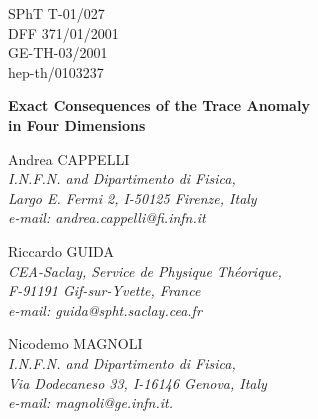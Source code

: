 \documentclass[11pt]{article}
\begin{document}
  
 
 
\begin{titlepage} 
\begin{center} 
 
\hfill SPhT T-01/027 \\
\hfill  DFF 371/01/2001 \\ 
\hfill  GE-TH-03/2001\\ 
\hfill hep-th/0103237\\
 
\vspace{1.cm} 
 
{\bf\Large Exact Consequences of the Trace Anomaly} \\ 
 
\bigskip 
{\bf\Large in Four Dimensions}\\ 
 
\vspace{1cm} 
 
Andrea CAPPELLI\\ 
\normalsize\textit{ I.N.F.N. and Dipartimento di Fisica,} \\ 
\normalsize\textit{ Largo E. Fermi 2, I-50125 Firenze, Italy}\\ 
\normalsize\textit{ e-mail: andrea.cappelli@fi.infn.it}\\ 
 
\vspace{.3cm} 
 
Riccardo GUIDA\\ 
\normalsize\textit{ CEA-Saclay, Service de Physique Th\'eorique,} \\ 
\normalsize\textit{ F-91191 Gif-sur-Yvette, France}\\ 
\normalsize\textit{ e-mail: guida@spht.saclay.cea.fr}\\ 
 
\vspace{.3cm} 
 
Nicodemo MAGNOLI\\ 
\normalsize\textit{ I.N.F.N. and Dipartimento di Fisica,} \\ 
\normalsize\textit{ Via Dodecaneso 33, I-16146 Genova, Italy}\\ 
\normalsize\textit{ e-mail: magnoli@ge.infn.it.}\\ 
 
\vspace{.5cm} 
 

\end{center}
\end{titlepage}
\end{document}
